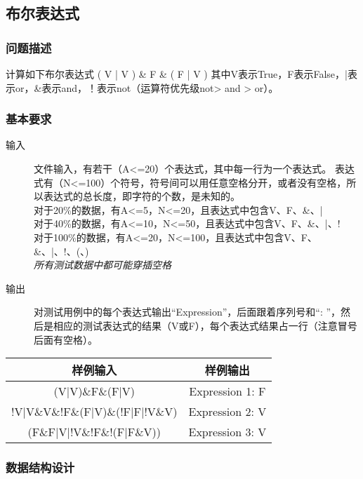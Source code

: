 \documentclass[12pt]{article}
\begin{document}
\subsection{布尔表达式}
\subsubsection{问题描述}
{\songti 计算如下布尔表达式 ( V | V ) \& F \& ( F | V ) 其中V表示True，F表示False，|表示or，\&表示and，！表示not（运算符优先级not> and > or）。}
\subsubsection{基本要求}
\begin{description}
    \item[输入] 文件输入，有若干（A<=20）个表达式，其中每一行为一个表达式。 表达式有（N<=100）个符号，符号间可以用任意空格分开，或者没有空格，所以表达式的总长度，即字符的个数，是未知的。\\
对于20\%的数据，有A<=5，N<=20，且表达式中包含V、F、\&、|\\
对于40\%的数据，有A<=10，N<=50，且表达式中包含V、F、\&、|、!\\
对于100\%的数据，有A<=20，N<=100，且表达式中包含V、F、\&、|、!、(、)\\
\textit{所有测试数据中都可能穿插空格} 
    \item[输出] 对测试用例中的每个表达式输出“Expression”，后面跟着序列号和“: ”，然后是相应的测试表达式的结果（V或F），每个表达式结果占一行（注意冒号后面有空格）。
\end{description}
\begin{center}
\begin{tabular}{|c|c|}
    \hline
   样例输入  & 样例输出 \\  \hline
   (V|V)\&F\&(F|V)  &  Expression 1: F\\  \hline
   !V|V\&V\&!F\&(F|V)\&(!F|F|!V\&V)  &   Expression 2: V \\  \hline
   (F\&F|V|!V\&!F\&!(F|F\&V))   &   Expression 3: V \\ \hline
\end{tabular}
\end{center}
\subsubsection{数据结构设计}
\end{document}
